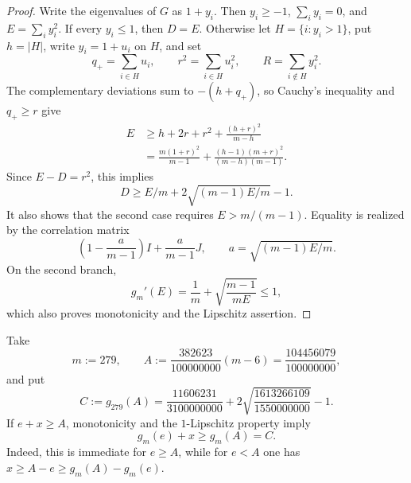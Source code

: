 \documentclass[11pt]{article}
\begin{document}
\begin{proof}
Write the eigenvalues of $G$ as $1+y_i$.  Then $y_i\ge-1$,
$\sum_i y_i=0$, and $E=\sum_i y_i^2$.  If every $y_i\le1$, then
$D=E$.  Otherwise let $H=\{i:y_i>1\}$, put $h=|H|$, write
$y_i=1+u_i$ on $H$, and set
\[
 q_+=\sum_{i\in H}u_i,
 \qquad r^2=\sum_{i\in H}u_i^2,
 \qquad R=\sum_{i\notin H}y_i^2.
\]
The complementary deviations sum to $-(h+q_+)$, so Cauchy's inequality and
$q_+\ge r$ give
\begin{align*}
 E
 &\ge h+2r+r^2+\frac{(h+r)^2}{m-h}\\
 &=\frac{m(1+r)^2}{m-1}
   +\frac{(h-1)(m+r)^2}{(m-h)(m-1)}.
\end{align*}
Since $E-D=r^2$, this implies
\[
 D\ge E/m+2\sqrt{(m-1)E/m}-1.
\]
It also shows that the second case requires $E>m/(m-1)$.  Equality is
realized by the correlation matrix
\[
 \left(1-\frac{a}{m-1}\right)I+\frac{a}{m-1}J,
 \qquad a=\sqrt{(m-1)E/m}.
\]
On the second branch,
\[
 g_m'(E)=\frac1m+\sqrt{\frac{m-1}{mE}}\le1,
\]
which also proves monotonicity and the Lipschitz assertion.
\end{proof}

Take
\begin{equation}\label{eq:mA}
 m:=279,
 \qquad
 A:=\frac{382623}{100000000}(m-6)
   =\frac{104456079}{100000000},
\end{equation}
and put
\begin{equation}\label{eq:C}
 C:=g_{279}(A)
 =\frac{11606231}{3100000000}
  +2\sqrt{\frac{1613266109}{1550000000}}-1.
\end{equation}
If $e+x\ge A$, monotonicity and the $1$-Lipschitz property imply
\begin{equation}\label{eq:span-tradeoff}
 g_m(e)+x\ge g_m(A)=C.
\end{equation}
Indeed, this is immediate for $e\ge A$, while for $e<A$ one has
$x\ge A-e\ge g_m(A)-g_m(e)$.
\end{document}

